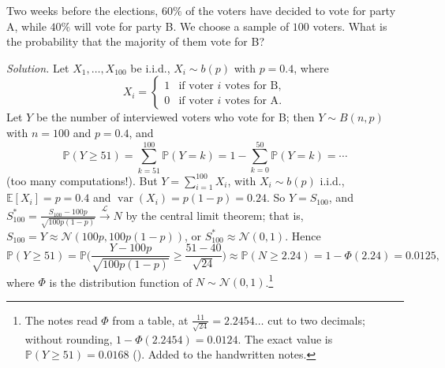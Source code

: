 \begin{example}\label{exa:ct-poll}
Two weeks before the elections, $60\%$ of the voters have decided to vote for party A, while
$40\%$ will vote for party B. We choose a sample of $100$ voters. What is the probability that the
majority of them vote for B?

\emph{Solution.} Let $X_1,\dots,X_{100}$ be i.i.d., $X_i\sim b(p)$ with $p=0.4$, where
\[
  X_i=\begin{cases}1&\text{if voter $i$ votes for B},\\0&\text{if voter $i$ votes for A}.\end{cases}
\]
Let $Y$ be the number of interviewed voters who vote for B; then $Y\sim B(n,p)$ with $n=100$ and
$p=0.4$, and
\[
  \mathbb P(Y\ge51)=\sum_{k=51}^{100}\mathbb P(Y=k)=1-\sum_{k=0}^{50}\mathbb P(Y=k)=\cdots
\]
(too many computations!). But $Y=\sum_{i=1}^{100}X_i$, with $X_i\sim b(p)$ i.i.d., $\mathbb E[X_i]=p=0.4$ and
$\operatorname{var}(X_i)=p(1-p)=0.24$. So $Y=S_{100}$, and
$S_{100}^*=\frac{S_{100}-100p}{\sqrt{100p(1-p)}}\xrightarrow{\mathcal L}N$ by the central limit
theorem; that is, $S_{100}=Y\approx\mathcal N(100p,100p(1-p))$, or $S_{100}^*\approx\mathcal N(0,1)$.
Hence
\[
  \mathbb P(Y\ge51)=\mathbb P\bigg(\frac{Y-100p}{\sqrt{100p(1-p)}}\ge\frac{51-40}{\sqrt{24}}\bigg)
  \approx\mathbb P(N\ge2.24)=1-\Phi(2.24)=0.0125,
\]
where $\Phi$ is the distribution function of $N\sim\mathcal N(0,1)$.\footnote{The notes read $\Phi$
from a table, at $\frac{11}{\sqrt{24}}=2.2454\ldots$ cut to two decimals; without rounding,
$1-\Phi(2.2454)=0.0124$. The exact value is $\mathbb P(Y\ge51)=0.0168$ ().
Added to the handwritten notes.}
\end{example}

